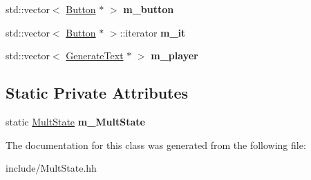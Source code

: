 \begin{DoxyCompactItemize}
\item 
\hypertarget{class_mult_state_afff7dc12ed21189dfaf330cfac76a624}{}std\+::vector$<$ \hyperlink{class_button}{Button} $\ast$ $>$ {\bfseries m\+\_\+button}\label{class_mult_state_afff7dc12ed21189dfaf330cfac76a624}

\item 
\hypertarget{class_mult_state_aefe2e8eb929f616f03101fe8363a26fc}{}std\+::vector$<$ \hyperlink{class_button}{Button} $\ast$ $>$\+::iterator {\bfseries m\+\_\+it}\label{class_mult_state_aefe2e8eb929f616f03101fe8363a26fc}

\item 
\hypertarget{class_mult_state_a34dfbf5b99b8a6e46f4b5605a80ba7ef}{}std\+::vector$<$ \hyperlink{class_generate_text}{Generate\+Text} $\ast$ $>$ {\bfseries m\+\_\+player}\label{class_mult_state_a34dfbf5b99b8a6e46f4b5605a80ba7ef}

\end{DoxyCompactItemize}
\subsection*{Static Private Attributes}
\begin{DoxyCompactItemize}
\item 
\hypertarget{class_mult_state_ada2748087d38cdc41c64104586f3e71c}{}static \hyperlink{class_mult_state}{Mult\+State} {\bfseries m\+\_\+\+Mult\+State}\label{class_mult_state_ada2748087d38cdc41c64104586f3e71c}

\end{DoxyCompactItemize}


The documentation for this class was generated from the following file\+:\begin{DoxyCompactItemize}
\item 
include/Mult\+State.\+hh\end{DoxyCompactItemize}
